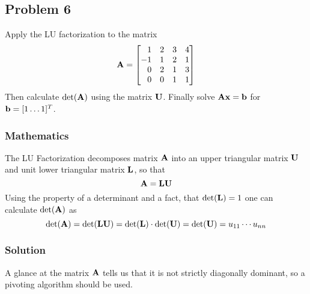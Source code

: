 \subsection{Problem 6}

Apply the LU factorization to the matrix
\begin{equation*}
    \mathbf{A} = 
    \begin{bmatrix}
        \phantom{-}1 & 2 & 3 & 4 \\
        -1 & 1 & 2 & 1 \\
        \phantom{-}0 & 2 & 1 & 3 \\
        \phantom{-}0 & 0 & 1 & 1
    \end{bmatrix}
\end{equation*}
Then calculate $\det(\mathbf{A})$ using the matrix $\mathbf{U}$. Finally solve $\mathbf{A}\mathbf{x}=\mathbf{b}$ for $\mathbf{b}=[1\dots1]^T$.
\subsubsection*{Mathematics}
The LU Factorization decomposes matrix $\mathbf{A}$ into an upper triangular matrix $\mathbf{U}$ and unit lower triangular matrix $\mathbf{L}$, so that
\begin{equation*}
    \mathbf{A} = \mathbf{L}\mathbf{U}
\end{equation*}
Using the property of a determinant and a fact, that $\det(\mathbf{L}) = 1$ one can calculate $\det(\mathbf{A})$ as
\begin{equation*}
    \det(\mathbf{A}) = \det(\mathbf{L}\mathbf{U}) = \det(\mathbf{L}) \cdot \det(\mathbf{U}) = \det(\mathbf{U}) = u_{11}\cdots u_{nn}
\end{equation*}
\subsubsection*{Solution}
A glance at the matrix $\mathbf{A}$ tells us that it is not strictly diagonally dominant, so a pivoting algorithm should be used.

